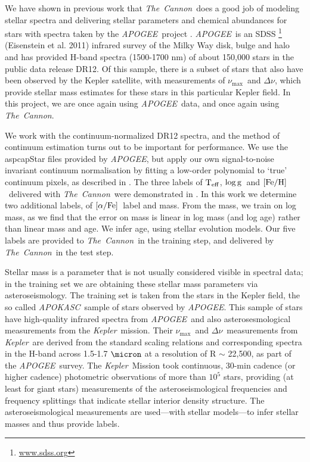 \documentclass[12pt, preprint]{aastex}
\newcommand{\project}[1]{\textsl{#1}}
\newcommand{\tc}{\project{The~Cannon}}
\newcommand{\apogee}{\project{APOGEE}}
\newcommand{\apokasc}{\project{APOKASC}}
\newcommand{\kepler}{\project{Kepler}}
\newcommand{\teff}{\mbox{$\rm T_{eff}$}}
\newcommand{\feh}{\mbox{$\rm [Fe/H]$}}
\newcommand{\alphafe}{\mbox{$\rm [\alpha/Fe]$}}
\newcommand{\logg}{\mbox{$\rm \log g$}}
\newcommand{\numax}{$\nu_{\max}$}
\newcommand{\deltanu}{$\Delta\nu$}
\begin{document}
We have shown in previous work \citep{Ness2015} that \tc\ does a good job
of modeling stellar spectra and delivering stellar parameters and
chemical abundances for stars with spectra taken by the \apogee\ project \citep{Majewski2012}.  \apogee\ is an SDSS \footnote{\url{www.sdss.org}} (Eisenstein et al. 2011) infrared survey of the Milky Way disk, bulge and halo and has provided H-band spectra (1500-1700 nm) of about 150,000 stars in the public data release DR12.  Of this sample, there is a subset of stars that also have been observed by the Kepler satellite, with measurements of \numax\ and \deltanu, which provide stellar mass estimates for these stars in this particular Kepler field.  In this project, we are once again using \apogee\ data, and once again
using \tc. %

We work with the continuum-normalized DR12 spectra, and the method of continuum
estimation turns out to be important for performance. We use the aspcapStar files provided by \apogee, but apply our own signal-to-noise invariant continuum normalisation by fitting a low-order polynomial to `true' continuum pixels, as described in \citet{Ness2015}. 
The three labels of \teff, \logg\ and \feh\ delivered with \tc\ were demonstrated in \citet{Ness2015}.  In this work we determine two additional labels, of \alphafe\ label and mass. From the mass, we train on log mass, as we find that the error on mass is linear in log mass (and log age) rather than linear mass and age. We infer age, using stellar evolution models. Our five labels are provided to \tc\ in the training step, and delivered by \tc\ in the test step.

Stellar mass is a parameter that is not usually considered visible in
spectral data; in the training set we are obtaining these stellar mass
parameters via asteroseismology. The training set is taken from the stars in the Kepler field, the so called \apokasc\ sample \citep{P2014}  of stars observed by \apogee.
This sample of stars have high-quality infrared
spectra from \apogee\ and also asterosesmological measurements from the \kepler\ mission.
Their \numax\ and \deltanu\ measurements from \kepler\ are derived from the standard scaling relations \citep[see][and references therein]{P2014} and corresponding spectra in the H-band across 1.5-1.7 $\micron$ at a resolution of R $\sim$ 22,500, as part of the \apogee\ survey. 
The \kepler\ Mission \citep{B2010} took continuous, 30-min cadence (or
higher cadence) photometric observations of more than $10^5$ stars,
providing (at least for giant stars) measurements of the
asteroseismological frequencies and frequency splittings that indicate
stellar interior density structure.
The asteroseismological measurements are used---with stellar
models---to infer stellar masses and thus provide labels.
\end{document}
